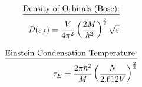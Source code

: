 \documentclass[12pt]{article}
\begin{document}
\noindent{}

\begin{multicols}{2}

  \begin{equation*}
    \begin{split}
    \text{\underline{Density of Orbitals (Bose):}}\\
    \mathcal{D}(\varepsilon_f)=\frac{V}{4\pi^2}\left( \frac{2M}{\hbar^2} \right)^{\frac{3}{2}}\sqrt{\varepsilon}
    \end{split}
  \end{equation*}

  \begin{equation*}
    \begin{split}
      \text{\underline{Einstein Condensation Temperature:}}\\
      \tau_E=\frac{2\pi\hbar^2}{M}\left( \frac{N}{2.612V} \right)^{\frac{2}{3}}
    \end{split}
  \end{equation*}

\end{multicols}
\end{document}
